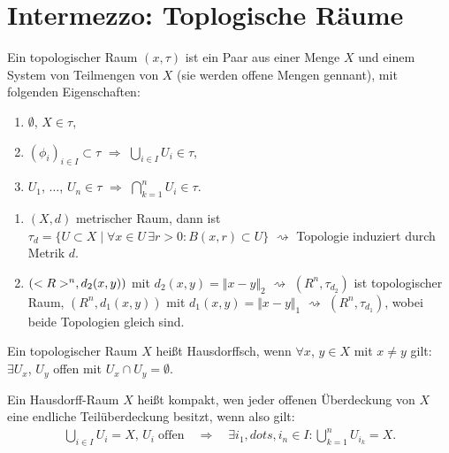 \section{Intermezzo: Toplogische Räume}
\begin{definition}
	Ein topologischer Raum $(x,\tau)$ ist ein Paar aus einer Menge $X$ und einem System von Teilmengen von $X$ (sie werden offene Mengen gennant), mit folgenden Eigenschaften: \begin{enumerate}[label={(\arabic*)}]
		\item $\emptyset$, $X\in\tau$,
		\item $(\phi_i)_{i\in I}\subset\tau$ $\Rightarrow$ $\bigcup_{i\in I} U_i\in\tau$,
		\item $U_1$, $\dots$, $U_n\in\tau$ $\Rightarrow$ $\bigcap_{k=1}^n U_i\in\tau$.
	\end{enumerate}
\end{definition}

\begin{example}
	\begin{enumerate}[label={(\arabic*)}]
		\item $(X,d)$ metrischer Raum, dann ist $\tau_d = \{ U\subset X\mid \forall x\in U\,\exists r>0\colon B(x,r)\subset U\}$ $\rightsquigarrow$ Topologie induziert durch Metrik $d$.
		\item $(<R>^n, d_2(x,y))$ mit $d_2(x,y) = \Vert x-y\Vert_2$ $\rightsquigarrow$ $(R^n,\tau_{d_2})$ ist topologischer Raum, $(R^n, d_1(x,y))$ mit $d_1(x,y) = \Vert x-y\Vert_1$ $\rightsquigarrow$ $(R^n,\tau_{d_1})$, wobei beide Topologien gleich sind.
	\end{enumerate}
\end{example}

\begin{definition}
	Ein topologischer Raum $X$ heißt Hausdorffsch, wenn $\forall x$, $y\in X$ mit $x\neq y$ gilt: $\exists U_x$, $U_y$ offen mit $U_x\cap U_y = \emptyset$.
\end{definition}

\begin{definition}
	Ein Hausdorff-Raum $X$ heißt kompakt, wen jeder offenen Überdeckung von $X$ eine endliche Teilüberdeckung besitzt, wenn also gilt: \begin{align*}
		\bigcup_{i\in I} U_i = X,\, U_i\;\text{offen}\quad\Rightarrow\quad\exists i_1,dots,i_n\in I: \bigcup_{k=1}^n U_{i_k}=X.
	\end{align*}
\end{definition}

